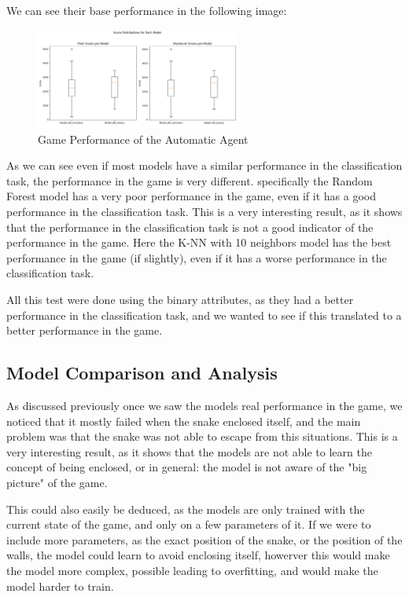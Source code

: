 \documentclass[12pt,a4paper]{article}
\begin{document}
We can see their base performance in the following image:

\begin{figure}[ht]
    \centering
    \includegraphics[width=0.6\textwidth]{./images/binary_comparaison.png} %
    \caption{Game Performance of the Automatic Agent}
    \label{fig:game}
\end{figure}

As we can see even if most models have a similar performance in the classification task, the performance in the game is very different.
specifically the Random Forest model has a very poor performance in the game, even if it has a good performance in the classification task.
This is a very interesting result, as it shows that the performance in the classification task is not a good indicator of the performance in the game.
Here the K-NN with 10 neighbors model has the best performance in the game (if slightly), even if it has a worse performance in the classification task.

All this test were done using the binary attributes, as they had a better performance in the classification task, and we wanted to see if this translated to a better performance in the game.

\subsection{Model Comparison and Analysis}

As discussed previously once we saw the models real performance in the game, 
we noticed that it mostly failed when the snake enclosed itself, and the main problem was that the snake was not able to escape from this situations.
This is a very interesting result, as it shows that the models are not able to learn the concept of being enclosed, 
or in general: the model is not aware of the "big picture" of the game.

This could also easily be deduced, as the models are only trained with the current state of the game, and only on a few parameters of it.
If we were to include more parameters, as the exact position of the snake, or the position of the walls, the model could learn to avoid enclosing itself,
howerver this would make the model more complex, possible leading to overfitting, and would make the model harder to train.
\end{document}
